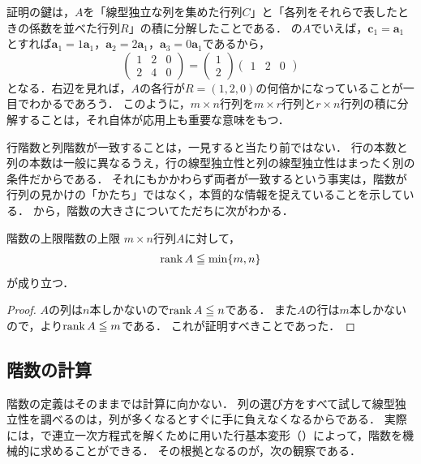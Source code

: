 証明の鍵は，$A$を「線型独立な列を集めた行列$C$」と「各列をそれらで表したときの係数を並べた行列$R$」の積に分解したことである．
の$A$でいえば，$\bm{c}_1 = \bm{a}_1$とすれば$\bm{a}_1 = 1\bm{a}_1$，$\bm{a}_2 = 2\bm{a}_1$，$\bm{a}_3 = 0\bm{a}_1$であるから，
\[
  \begin{pmatrix} 1 & 2 & 0 \\ 2 & 4 & 0 \end{pmatrix}
  = \begin{pmatrix} 1 \\ 2 \end{pmatrix}
    \begin{pmatrix} 1 & 2 & 0 \end{pmatrix}
\]
となる．右辺を見れば，$A$の各行が$R = (1, 2, 0)$の何倍かになっていることが一目でわかるであろう．
このように，$m \times n$行列を$m \times r$行列と$r \times n$行列の積に分解することは，それ自体が応用上も重要な意味をもつ．

行階数と列階数が一致することは，一見すると当たり前ではない．
行の本数と列の本数は一般に異なるうえ，行の線型独立性と列の線型独立性はまったく別の条件だからである．
それにもかかわらず両者が一致するという事実は，階数が行列の見かけの「かたち」ではなく，本質的な情報を捉えていることを示している．
から，階数の大きさについてただちに次がわかる．

\begin{cor}{階数の上限}{階数の上限}
  $m \times n$行列$A$に対して，
  \[
    \operatorname{rank} A \leqq \min\{m, n\}
  \]
  が成り立つ．
\end{cor}

\begin{tleftbar}
\begin{proof}
  $A$の列は$n$本しかないので$\operatorname{rank} A \leqq n$である．
  また$A$の行は$m$本しかないので，より$\operatorname{rank} A \leqq m$である．
  これが証明すべきことであった．
\end{proof}
\end{tleftbar}

\subsection{階数の計算}

階数の定義はそのままでは計算に向かない．
列の選び方をすべて試して線型独立性を調べるのは，列が多くなるとすぐに手に負えなくなるからである．
実際には，で連立一次方程式を解くために用いた行基本変形（）によって，階数を機械的に求めることができる．
その根拠となるのが，次の観察である．

